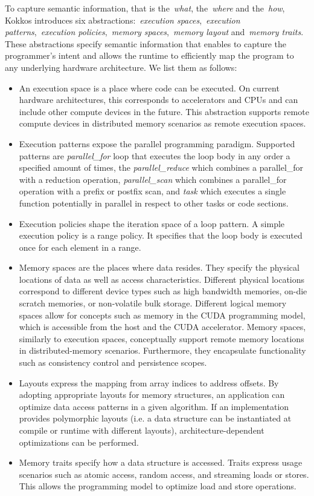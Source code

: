 To capture semantic information, that is the~\emph{what}, the~\emph{where} and the~\emph{how}, Kokkos introduces six abstractions:~\emph{execution spaces},~\emph{execution patterns},~\emph{execution policies},~\emph{memory spaces},~\emph{memory layout} and~\emph{memory traits}. These abstractions specify semantic information that enables to capture the programmer's intent and allows the runtime to efficiently map the program to any underlying hardware architecture. We list them as follows:
\begin{itemize}
	\item  An execution space is a place where code can be executed. On current hardware architectures, this corresponds to accelerators and CPUs and can include other compute devices in the future. This abstraction supports remote compute devices in distributed memory scenarios as remote execution spaces.
	\item Execution patterns expose the parallel programming paradigm. Supported patterns are \emph{parallel\_for} loop that executes the loop body in any order a specified amount of times, the \emph{parallel\_reduce} which combines a parallel\_for with a reduction operation, \emph{parallel\_scan} which combines a parallel\_for operation with a prefix or postfix scan, and \emph{task} which executes a single function potentially in parallel in respect to other tasks or code sections. 
	\item Execution policies shape the iteration space of a loop pattern. A simple execution policy is a range policy. It specifies that the loop body is executed once for each element in a range.
	\item Memory spaces are the places where data resides. They specify the physical locations of data as well as access characteristics. Different physical locations correspond to different device types such as high bandwidth memories, on-die scratch memories, or non-volatile bulk storage. Different logical memory spaces allow for concepts such as memory in the CUDA programming model, which is accessible from the host and the CUDA accelerator. Memory spaces, similarly to execution spaces, conceptually support remote memory locations in distributed-memory scenarios. Furthermore, they encapsulate functionality such as consistency control and persistence scopes.
	\item Layouts express the mapping from array indices to address offsets. By adopting appropriate layouts for memory structures, an application can optimize data access patterns in a given algorithm. If an implementation provides polymorphic layouts (i.e. a data structure can be instantiated at compile or runtime with different layouts), architecture-dependent optimizations can be performed.
	\item Memory traits specify how a data structure is accessed. Traits express usage scenarios such as atomic access, random access, and streaming loads or stores. This allows the programming model to optimize load and store operations.
\end{itemize}

